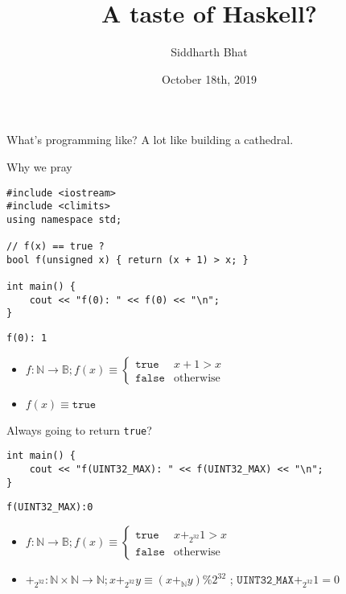 \documentclass[8pt]{beamer}
\author{Siddharth Bhat}
\date{October 18th, 2019}
\institute{IIIT Open Source Developers group}
\title{A taste of Haskell?}
\newcommand{\N}{\mathbb N}
\newcommand{\B}{\mathbb B}
\newcommand{\cpp}[1]{\texttt{#1}}
\begin{document}
\maketitle

\begin{frame}[fragile]{What's programming like?}
    A lot like building a cathedral.
\end{frame}

\begin{frame}[fragile]{Why we pray}
\pause

{\small
\begin{verbatim}
#include <iostream>
#include <climits>
using namespace std;

// f(x) == true ?
bool f(unsigned x) { return (x + 1) > x; }

int main() {
    cout << "f(0): " << f(0) << "\n";
}
\end{verbatim}
\pause
\begin{verbatim}
f(0): 1
\end{verbatim}
\pause
\begin{itemize}
    \item 
        $f: \N \rightarrow \B; f(x) \equiv \begin{cases} \texttt{true} & x + 1 > x \\ \texttt{false} & \text{otherwise} \end{cases}$
        \pause
    \item $f(x) \equiv \texttt{true}$ \pause
\end{itemize}
Always going to return \cpp{true}?
\pause
\begin{verbatim}
int main() {
    cout << "f(UINT32_MAX): " << f(UINT32_MAX) << "\n";
}
\end{verbatim}
}

\pause
\begin{verbatim}
f(UINT32_MAX):0
\end{verbatim}

\pause
\begin{itemize}
    \item $f: \N \rightarrow \B; f(x) \equiv \begin{cases} \texttt{true} & x +_{2^{32}} 1 > x \\ \texttt{false} & \text{otherwise} \end{cases}$ \pause
    \item $+_{2^32}: \N \times \N \rightarrow \N; x +_{2^{32}} y \equiv (x +_\N y) \% 2^{32}$ \pause; $\texttt{UINT32\_MAX} +_{2^{32}} 1 = 0 $
\end{itemize}
\end{frame}
\end{document}
